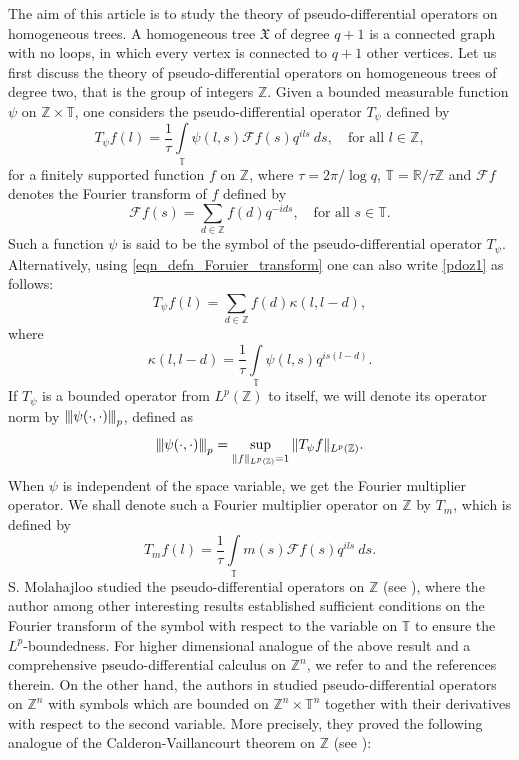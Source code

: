 \documentclass[12pt,reqno]{amsart}
\newcommand{\vertiii}[1]{{\left\vert\kern-0.25ex\left\vert\kern-0.25ex\left\vert #1 
		\right\vert\kern-0.25ex\right\vert\kern-0.25ex\right\vert}}
\newcommand{\Z}{\mathbb Z}%
\newcommand{\T}{\mathbb{T}}
\theoremstyle{definition}
\theoremstyle{definition}
\numberwithin{equation}{section}
\begin{document}
The aim of this article is to study the theory of pseudo-differential operators on homogeneous trees. A homogeneous tree $\mathfrak{X}$ of degree $q+1$ is a connected graph with no loops, in which every vertex is connected to $q+1$ other vertices. Let us first discuss the theory of pseudo-differential operators on homogeneous trees of degree two, that is the group of integers $\mathbb{Z}$. Given a bounded measurable function $\psi$ on $\mathbb{Z}\times\mathbb{T}$, one considers the pseudo-differential operator $T_{\psi}$ defined by
\begin{equation}\label{pdoz1}
T_{\psi}f(l)=\frac{1}{\tau}\int\limits_{\mathbb{T}}\psi(l,s)\mathcal{F}f(s)q^{ils}~ds,\quad\text{for all }l\in\mathbb{Z},
\end{equation}
for a finitely supported function $f$ on $\mathbb{Z}$, where $\tau=2\pi/\log q$, $\mathbb{T}=\mathbb{R}/\tau\mathbb{Z}$ and $\mathcal{F}f$ denotes the Fourier transform of $f$ defined by
\begin{equation}\label{eqn_defn_Foruier_transform}
	\mathcal{F}f(s)=\sum\limits_{d\in\mathbb{Z}}f(d)q^{-ids},\quad\text{for all }s\in\mathbb{T}.
\end{equation}
Such a function $\psi$ is said to be the symbol of the pseudo-differential operator $T_{\psi}$. Alternatively, using \eqref{eqn_defn_Foruier_transform} one can also write \eqref{pdoz1} as follows:
\begin{equation}
	 T_{\psi}f(l)= \sum_{d\in \Z}f(d) \kappa (l,l-d),
\end{equation}
where $$ \kappa(l,l-d) =\frac{1}{\tau} \int\limits_\T \psi (l,s) q^{is(l-d)}.$$
If $T_{\psi}$ is a bounded operator from $L^{p}(\mathbb{Z})$ to itself, we will denote its operator norm by $\vertiii{\psi(\cdot,\cdot)}_{p}$, defined as
$$\vertiii{\psi(\cdot,\cdot)}_{p}  = \sup_{\| f\|_{L^p(\Z)} =1} \|T_\psi f\|_{L^p(\Z)}.$$
When $\psi$ is independent of the space variable, we get the Fourier multiplier operator. We shall denote such a Fourier multiplier operator on $\mathbb{Z}$ by $T_{m}$, which is defined by
\begin{equation}\label{multiplierz}
T_{m}f(l)=\frac{1}{\tau}\int\limits_{\mathbb{T}}m(s)\mathcal{F}f(s)q^{ils}~ds.
\end{equation}
S. Molahajloo studied the pseudo-differential operators on $\mathbb{Z}$ (see \cite{MR2664583}), where the author among other interesting results established sufficient conditions on the Fourier transform of the symbol with respect to the variable on $\mathbb{T}$ to ensure the $L^{p}$-boundedness. For higher dimensional analogue of the above result and a comprehensive pseudo-differential calculus on $ \Z^n $, we refer to \cite{Botchway_Ruzhansky_2020,MR2831664} and the references therein. On the other hand, the authors in \cite{MR2104184} studied pseudo-differential operators on $\mathbb{Z}^{n}$ with symbols which are bounded on $\mathbb{Z}^{n}\times\mathbb{T}^{n}$ together with their derivatives with respect to the second variable. More precisely, they proved the following analogue  of the Calderon-Vaillancourt theorem on $\mathbb{Z}$ (see \cite[Theorem 2.8]{MR2104184}):
\end{document}
